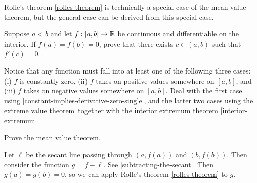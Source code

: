 Rolle's theorem \ref{rolles-theorem} is technically a special case of the mean value theorem, but the general case can be derived from this special case. 

\begin{exercise} \label{rolles-theorem}  
	Suppose $a < b$ and let $f : [a, b] \to \mathbb{R}$ be continuous and differentiable on the interior. If $f(a) = f(b) = 0$, prove that there exists $c \in (a, b)$ such that $f'(c) = 0$. 
	\begin{hint}
		Notice that any function must fall into at least one of the following three cases: (i) $f$ is constantly zero, (ii) $f$ takes on positive values somewhere on $[a, b]$, and (iii) $f$ takes on negative values somewhere on $[a, b]$. Deal with the first case using \cref{constant-implies-derivative-zero-single}, and the latter two cases using the extreme value theorem\footnotemark\ together with the interior extremum theorem \cref{interior-extremum}. 
	\end{hint}
\end{exercise}


\begin{exercise}
	Prove the mean value theorem. 
	\begin{hint} 
		Let $\ell$ be the secant line passing through $(a, f(a))$ and $(b, f(b))$. Then consider the function $g = f - \ell$. See \cref{subtracting-the-secant}. 
		Then $g(a) = g(b) = 0$, so we can apply Rolle's theorem \ref{rolles-theorem} to $g$.
	\end{hint} 
\end{exercise}

